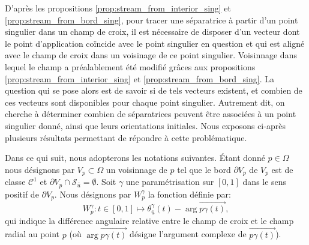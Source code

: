 D'après les propositions \ref{prop:stream_from_interior_sing} et \ref{prop:stream_from_bord_sing}, pour tracer une séparatrice à partir d'un point singulier dans un champ de croix, il est nécessaire de disposer d'un vecteur dont le point d'application coïncide avec le point singulier en question et qui est aligné avec le champ de croix dans un voisinage de ce point singulier. Voisinnage dans lequel le champ a préalablement été modifié grâces aux propositions \ref{prop:stream_from_interior_sing} et \ref{prop:stream_from_bord_sing}. La question qui se pose alors est de savoir si de tels vecteurs existent, et combien de ces vecteurs sont disponibles pour chaque point singulier. Autrement dit, on cherche à déterminer combien de séparatrices peuvent être associées à un point singulier donné, ainsi que leurs orientations initiales. Nous exposons ci-après plusieurs résultats permettant de répondre à cette problématique.

Dans ce qui suit, nous adopterons les notations suivantes. \'Etant donné $p\in\Omega$ nous désignons par $V_p\subset\Omega$ un voisinnage de $p$ tel que le bord $\partial V_p$ de $V_p$ est de classe $\mathcal{C}^1$ et $\partial V_p\cap\mathcal{S}_{\bar{u}}=\emptyset$. Soit $\gamma$ une paramétrisation sur $[0, 1]$ dans le sens positif de $\partial V_p$. Nous désignons par $W_p^\gamma$ la fonction définie par:
\begin{equation}
\label{eqn:Winding}
W_p^\gamma:t\in[0, 1]\longmapsto \theta^\gamma_{\bar{u}}(t)-\arg \overrightarrow{p\gamma(t)},
\end{equation}
qui indique la différence angulaire relative entre le champ de croix et le champ radial au point $p$ (où $\arg \overrightarrow{p\gamma(t)}$ désigne l'argument complexe de $\overrightarrow{p\gamma(t)}$).

